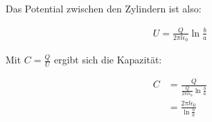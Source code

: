 \documentclass[a4paper,german,12pt,smallheadings]{scrartcl}
\begin{document}
Das Potential zwischen den Zylindern ist also:

\begin{align*}
  U = \frac{Q}{2 \pi l \epsilon_0} \ln \frac{b}{a}
\end{align*}

Mit $C = \frac{Q}{U}$ ergibt sich die Kapazität:

\begin{align*}
  C &= \frac{Q}{\frac{Q}{2 \pi l \epsilon_0} \ln \frac{b}{a}} \\
    &= \frac{2 \pi l \epsilon_0}{\ln \frac{b}{a}}
\end{align*}
\end{document}
